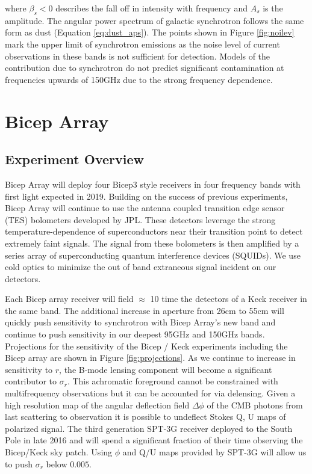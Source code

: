 \documentclass[12pt]{article}
\begin{document}
where $\beta _s < 0$ describes the fall off in intensity with frequency and
$A_s$ is the amplitude. The angular power spectrum of galactic synchrotron
follows the same form as dust (Equation \ref{eq:dust_aps}). The points shown
in Figure \ref{fig:noilev} mark the upper limit of synchrotron emissions as
the noise level of current observations in these bands is not sufficient for
detection. Models of the contribution due to synchrotron do not predict
significant contamination at frequencies upwards of 150GHz due to the strong
frequency dependence.


\section{Bicep Array}

\subsection{Experiment Overview}
Bicep Array will deploy four Bicep3 style receivers in four frequency bands
with first light expected in 2019. Building on the success of previous
experiments, Bicep Array will continue to use the antenna coupled transition
edge sensor (TES) bolometers developed by JPL. These detectors leverage the strong
temperature-dependence of superconductors near their transition point to
detect extremely faint signals. The signal from these bolometers is then
amplified by a series array of superconducting quantum interference devices
(SQUIDs). We use cold optics to minimize the out of band extraneous signal
incident on our detectors.

Each Bicep array receiver will field $\approx$ 10 time the detectors of a Keck
receiver in the same band. The additional increase in aperture from 26cm to
55cm will quickly push sensitivity to synchrotron with Bicep Array's new band
and continue to push sensitivity in our deepest 95GHz and 150GHz bands.
Projections for the sensitivity of the Bicep / Keck experiments including the
Bicep array are shown in Figure \ref{fig:projections}. As we continue to
increase in sensitivity to $r$, the B-mode lensing component will become a
significant contributor to $\sigma _r$. This achromatic foreground cannot be
constrained with multifrequency observations but it can be accounted for via
delensing. Given a high resolution map of the angular deflection field $\Delta
\phi$ of the CMB photons from last scattering to observation it is possible to
undeflect Stokes Q, U maps of polarized signal. The third generation SPT-3G
receiver deployed to the South Pole in late 2016 and will spend a significant
fraction of their time observing the Bicep/Keck sky patch. Using $\phi$ and
Q/U maps provided by SPT-3G will allow us to push $\sigma _r$ below $0.005$.
\end{document}
